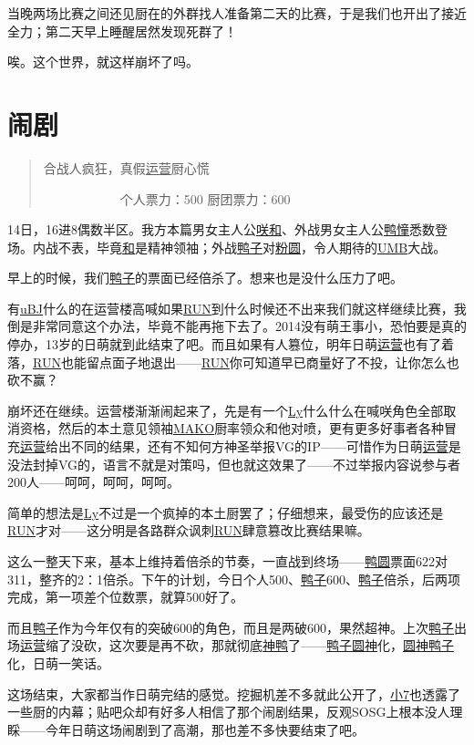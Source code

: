 当晚两场比赛之间还见厨在的外群找人准备第二天的比赛，于是我们也开出了接近全力；第二天早上睡醒居然发现死群了！

唉。这个世界，就这样崩坏了吗。

\chapter{闹剧}
\begin{quote}
合战人疯狂，真假\uline{运营}厨心慌

　　　　　　个人票力：500 厨团票力：600
\end{quote}

14日，16进8偶数半区。我方本篇男女主人公\uline{咲}\uline{和}、外战男女主人公\uline{鸭}\uline{憧}悉数登场。内战不表，毕竟\uline{和}是精神领袖；外战\uline{鸭子}对\uline{粉圆}，令人期待的\uline{UMB}大战。

早上的时候，我们\uline{鸭子}的票面已经倍杀了。想来也是没什么压力了吧。

有\uline{uBJ}什么的在运营楼高喊如果\uline{RUN}到什么时候还不出来我们就这样继续比赛，我倒是非常同意这个办法，毕竟不能再拖下去了。2014没有萌王事小，恐怕要是真的停办，13岁的日萌就到此结束了吧。而且如果有人篡位，明年日萌\uline{运营}也有了着落，\uline{RUN}也能留点面子地退出——\uline{RUN}你可知道早已商量好了不投，让你怎么也砍不赢？

崩坏还在继续。运营楼渐渐闹起来了，先是有一个\uline{Ly}什么什么在喊咲角色全部取消资格，然后的本土意见领袖\uline{MAKO}厨率领众和他对喷，更有更多好事者各种冒充\uline{运营}给出不同的结果，还有不知何方神圣举报VG的IP——可惜作为日萌\uline{运营}是没法封掉VG的，语言不就是对策吗，但也就这效果了——不过举报内容说参与者200人——呵呵，呵呵，呵呵。

简单的想法是\uline{Ly}不过是一个疯掉的本土厨罢了；仔细想来，最受伤的应该还是\uline{RUN}才对——这分明是各路群众讽刺\uline{RUN}肆意篡改比赛结果嘛。

这么一整天下来，基本上维持着倍杀的节奏，一直战到终场——\uline{鸭}\uline{圆}票面622对311，整齐的2：1倍杀。下午的计划，今日个人500、\uline{鸭子}600、\uline{鸭子}倍杀，后两项完成，第一项差个位数票，就算500好了。

而且\uline{鸭子}作为今年仅有的突破600的角色，而且是两破600，果然超神。上次\uline{鸭子}出场\uline{运营}缩了没砍，这次要是再不砍，那就彻底\uline{神鸭}了——\uline{鸭子}\uline{圆神}化，\uline{圆神}\uline{鸭子}化，日萌一笑话。

这场结束，大家都当作日萌完结的感觉。挖掘机差不多就此公开了，\uline{小7}也透露了一些厨的内幕；贴吧众却有好多人相信了那个闹剧结果，反观SOSG上根本没人理睬——今年日萌这场闹剧到了高潮，那也差不多快要结束了吧。

